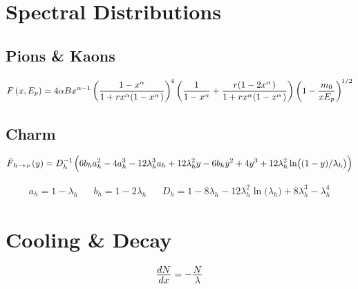\section{Spectral Distributions}
\label{sec:spectral}



\subsection*{Pions \& Kaons}

\begin{equation*}
	F \kern+1.5pt ( x, E_p ) = 4\alpha B x^{\alpha - 1} \left( \frac{1 - x^\alpha}{1 + rx^\alpha (1 - x^\alpha \kern+1.0pt )}
	\right)^{\kern-1.0pt 4} \left( \frac{1}{1 - x^\alpha} + \frac{r (1 - 2x^\alpha \kern+1.0pt )}{1 + rx^\alpha
	(1 - x^\alpha \kern+1.0pt )} \right) \left( 1 - \frac{m_0}{x E_p} \right)^{\kern-1.0pt 1/2}
\end{equation*}

\cite{Kelner_2006}



\subsection*{Charm}

\begin{equation*}
	\tilde{F}_{\kern+1.0pt h \kern+1.0pt \rightarrow \kern+1.0pt \nu \kern+1.0pt} (y) = D_h^{-1} \kern+1.0pt \Bigl( 6b_ha_h^2 - 4a_h^3
	- 12\lambda_h^3 a_h + 12\lambda_h^2 y - 6b_h y^2 + 4 y^3 + 12 \lambda_h^2 \ln \bigl((1 - y) / \lambda_h \bigr) \Bigr)
\end{equation*}

\begin{align*}
	a_h = 1 - \lambda_h && b_h = 1 - 2\lambda_h &&
	D_h = 1 - 8 \lambda_h - 12\lambda_h^2 \ln \bigl( \lambda_h \bigr) + 8 \lambda_h^3 - \lambda_h^4
\end{align*}





\section{Cooling \& Decay}
\label{sec:cooling}

\begin{equation*}
	\frac{\raisebox{-0.5ex}{$dN$}}{\raisebox{0.5ex}{$dx$}} = -\frac{\raisebox{-0.5ex}{$N$}}{\raisebox{0.5ex}{$\lambda$}}
\end{equation*}

